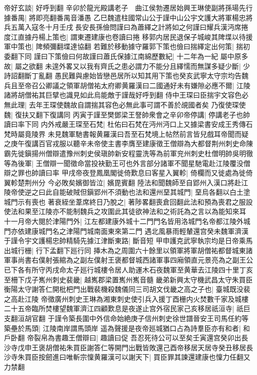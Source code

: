 帝好玄談|{
	好呼到翻}
辛卯於龍光殿講老子　曲江侯勃遷居始興王琳使副將孫瑒先行據番禺|{
	將即亮翻番禺音潘愚}
乙巳魏遣柱國常山公于謹中山公宇文護大將軍楊忠將兵五萬入寇冬十月壬戌長安長孫儉問謹曰為蕭繹之計將如之何謹曰耀兵漢沔席捲度江直據丹楊上策也|{
	謂東遷建康也卷讀曰捲}
移郭内居民退保子城峻其陴堞以待援軍中策也|{
	陴頻彌翻堞達協翻}
若難於移動據守羅郭下策也儉曰揣繹定出何策|{
	揣初委翻下同}
謹曰下策儉曰何故謹曰蕭氏保據江南綿歷數紀|{
	十二年為一紀}
屬中原多故|{
	屬之欲翻}
未遑外畧又以我有齊氏之患必謂力不能分且繹懦而無謀多疑少斷|{
	少詩詔翻斷丁亂翻}
愚民難與慮始皆戀邑居所以知其用下策也癸亥武寧太守宗均告魏兵且至帝召公卿議之領軍胡僧祐太府卿黄羅漢曰二國通好未有嫌隙必應不爾|{
	江陵諸將胡僧祐其巨擘也識見如此烏能敵于謹哉好呼到翻}
侍中王琛曰臣揣宇文容色必無此理|{
	去年王琛使魏故自謂揣其容色必無此事可謂不善於覘國者矣}
乃復使琛使魏|{
	復扶又翻下復講同}
丙寅于謹至樊鄧梁王詧帥衆會之辛卯帝停講|{
	停講老子也帥讀曰率下同}
内外戒嚴王琛至石梵|{
	杜佑曰石梵在沔州沔口上又據梁書安成王秀傳石梵時屬竟陵界}
未見魏軍馳書報黄羅漢曰吾至石梵境上帖然前言皆兒戲耳帝聞而疑之庚午復講百官戎服以聽辛未帝使主書李膺至建康徵王僧辯為大都督荆州刺史命陳霸先徙鎭揚州僧辯遣豫州刺史侯瑱帥新安程靈洗等為前軍兖州刺史杜僧明帥吳明徹等為後軍|{
	王僧辯一聞徵命當投袂勤王可也外言部分諸軍不聞星馳電赴江陵覆没僧辯之罪也帥讀曰率}
甲戌帝夜登鳳凰閣徙倚歎息曰客星入翼軫|{
	倚欄而又徙處為徙倚翼軫楚荆州分}
今必敗矣嬪御皆泣|{
	嬪毘賓翻}
陸法和聞魏師至自郢州入漢口將赴江陵帝使逆之曰此自能破賊但鎭郢州不須動也法和還州堊其城門|{
	堊烏各翻以白土塗城門示有喪也}
著衰絰坐葦席終日乃脫之|{
	著陟畧翻喪倉回翻此法和預為喪君之服設使法和果至江陵亦不能制魏兵之攻圍此其徒欲神法和之術託為之言以為能知來耳}
十一月帝大閱於津陽門外|{
	江左都建康外城十二門門名皆用洛城門名帝都江陵外城門亦依建康城門名之津陽門城南面東來第二門}
遇北風暴雨輕輦還宫癸未魏軍濟漢于謹令宇文護楊忠帥精騎先據江津斷東路|{
	斷音短}
甲申護克武寧執宗均是日帝乘馬出城行栅|{
	行下孟翻下廵行同}
挿木為之周圍六十餘里以領軍將軍胡僧祐都督城東諸軍事尚書右僕射張綰為之副左僕射王褒都督城西諸軍事四廂領直元景亮為之副王公已下各有所守丙戌命太子廵行城樓令居人助運木石夜魏軍至黄華去江陵四十里丁亥至柵下戊子嶲州刺史裴畿|{
	越嶲郡梁置嶲州嶲音髓}
畿弟新興太守機武昌太守朱買臣衡陽太守謝答仁開枇杷門出戰裴機殺魏儀同三司胡文伐畿之高之子也|{
	臺城既没裴之高赴江陵}
帝徵廣州刺史王琳為湘東刺史使引兵入援丁酉栅内火焚數千家及城樓二十五帝臨所焚樓望魏軍濟江四顧歎息是夜遂止宫外宿民家己亥移居祇洹寺|{
	祇巨支翻洹胡官翻}
于謹令築長圍中外信命始絶庚子信州刺史徐世譜晉安王司馬任約等築壘於馬頭|{
	江陵南岸謂馬頭岸}
遥為聲援是夜帝廵城猶口占為詩羣臣亦有和者|{
	和戶卧翻}
帝裂帛為書趣王僧辯曰|{
	趣讀曰促}
吾忍死待公可以至矣壬寅還宫癸卯出長沙寺戊申王褒胡僧祐朱買臣謝答仁等開門出戰皆敗還己酉帝移居天居寺癸丑移居長沙寺朱買臣按劒進曰唯斬宗懍黄羅漢可以謝天下|{
	買臣罪其諫還建康也懍力任翻又力禁翻}
